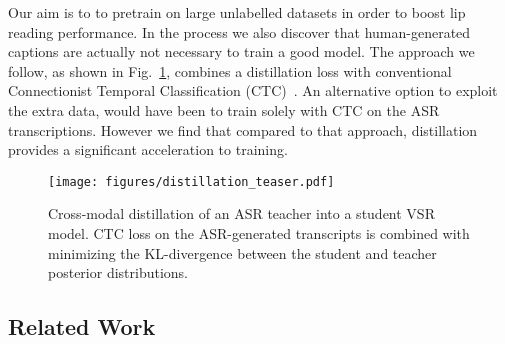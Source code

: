 \documentclass{article}
\def\psec{\vspace{-4pt}}
\begin{document}
Our aim is to to pretrain on large unlabelled datasets in order to boost lip reading performance.
In the process we also discover that human-generated captions are actually not necessary to train a
good model. 
The approach we follow, as shown in Fig.~\ref{fig:teaser}, combines a distillation loss with conventional 
Connectionist Temporal Classification (CTC)~\cite{Graves06}.
An alternative option to exploit the extra data, would have been to train solely with
CTC on the
ASR transcriptions. However we find that compared to that approach, distillation provides a
significant acceleration to training.

\begin{figure}[!thb]
\centering 
\vspace{-10pt}                              
\texttt{[image: figures/distillation\_teaser.pdf]}
\caption{Cross-modal distillation of an ASR teacher into a student VSR model.
  CTC loss on the ASR-generated transcripts is combined with minimizing the
  KL-divergence between the student and teacher posterior distributions. 
}
\label{fig:teaser} 
\vspace{-15pt}                              
\end{figure}












































\psec
\psec
\subsection{Related Work}
\psec
\end{document}
